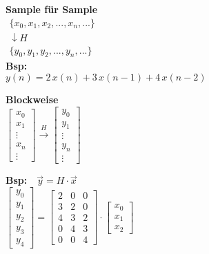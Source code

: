 	\begin{minipage}{0.45\textwidth}
		\textbf{Sample für Sample}\\[0.2cm]
		$\begin{array}{c}
		\{x_0,x_1,x_2,...,x_n,...\}\\ \downarrow H\\
		\{y_0,y_1,y_2,...,y_n,...\}
		\end{array}$\\[0.2cm]
		\textbf{Bsp:}\\[0.1cm]
		$y(n) = 2\,x(n) + 3\,x(n-1) + 4\, x(n-2)$
	\end{minipage}
	\begin{minipage}{0.25\textwidth}
		\textbf{Blockweise}\\[0.2cm]
		$\begin{bmatrix}x_0\\x_1\\\vdots\\x_n\\\vdots\end{bmatrix}\xrightarrow H \begin{bmatrix}y_0\\y_1\\\vdots\\y_n\\\vdots\end{bmatrix}$\\[0.2cm]
	\end{minipage}
	\begin{minipage}{0.25\textwidth}
		\textbf{Bsp:}$\quad\vec y = H\cdot \vec x$\\[0.2cm]
		$\begin{bmatrix}y_0\\y_1\\y_2\\y_3\\y_4\end{bmatrix} =\begin{bmatrix}2 & 0 & 0\\3 & 2 & 0\\4 & 3 & 2\\0 & 4 & 3 \\0 & 0 & 4\end{bmatrix}\cdot \begin{bmatrix}x_0\\x_1\\x_2\end{bmatrix}$
	\end{minipage}
	
